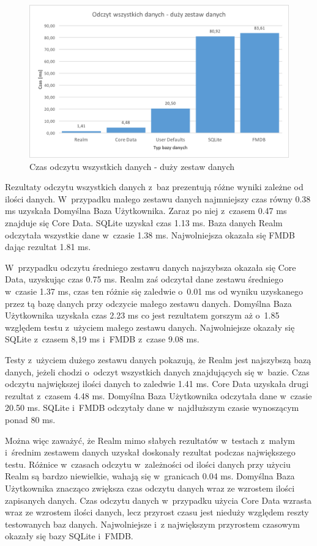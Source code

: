 \newpage

\begin{figure}[h]
\centering
	\includegraphics[width=15cm]{img/read_data/read_all/read_all_test_big.png}
	\caption{Czas odczytu wszystkich danych - duży zestaw danych}
	\label{fig: read-data-big}
\end{figure}

Rezultaty odczytu wszystkich danych z~baz prezentują różne wyniki zależne od ilości danych. W~przypadku małego zestawu danych najmniejszy czas równy 0.38 ms uzyskała Domyślna Baza Użytkownika. Zaraz po niej z~czasem 0.47 ms znajduje się Core Data. SQLite uzyskał czas 1.13 ms. Baza danych Realm odczytała wszystkie dane w~czasie 1.38 ms. Najwolniejsza okazała się FMDB dając rezultat 1.81 ms. 

 W~przypadku odczytu średniego zestawu danych najszybsza okazała się Core Data, uzyskując czas 0.75 ms. Realm zaś odczytał dane zestawu średniego w~czasie 1.37 ms, czas ten różnie się zaledwie o~0.01 ms od wyniku uzyskanego przez tą bazę danych przy odczycie małego zestawu danych. Domyślna Baza Użytkownika uzyskała czas 2.23 ms co jest rezultatem gorszym aż o~1.85 względem testu z~użyciem małego zestawu danych. Najwolniejsze okazały się SQLite z~czasem 8,19 ms i~FMDB z~czase 9.08 ms. 

Testy z~użyciem dużego zestawu danych pokazują, że Realm jest najszybszą bazą danych, jeżeli chodzi o~odczyt wszystkich danych znajdujących się w~bazie. Czas odczytu największej ilości danych to zaledwie 1.41 ms. Core Data uzyskała drugi rezultat z~czasem 4.48 ms. Domyślna Baza Użytkownika odczytała dane w~czasie 20.50 ms. SQLite i~FMDB odczytały dane w~najdłuższym czasie wynoszącym ponad 80 ms. 

Można więc zaważyć, że Realm mimo słabych rezultatów w~testach z~małym i~średnim zestawem danych uzyskał doskonały rezultat podczas największego testu. Różnice w~czasach odczytu w~zależności od ilości danych przy użyciu Realm są bardzo niewielkie, wahają się w~granicach 0.04 ms. Domyślna Baza Użytkownika znacząco zwiększa czas odczytu danych wraz ze wzrostem ilości zapisanych danych. Czas odczytu danych w~przypadku użycia Core Data wzrasta wraz ze wzrostem ilości danych, lecz przyrost czasu jest nieduży względem reszty testowanych baz danych. Najwolniejsze i~z największym przyrostem czasowym okazały się bazy SQLite i~FMDB. 

